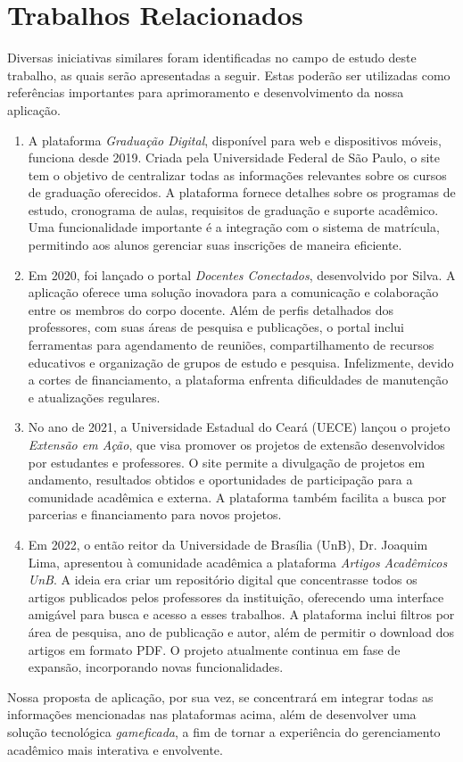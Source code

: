 \documentclass[a4paper,12pt]{report}
\begin{document}
\chapter{Trabalhos Relacionados}
Diversas iniciativas similares foram identificadas no campo de estudo deste trabalho, as quais serão apresentadas a seguir. Estas poderão ser utilizadas como referências importantes para aprimoramento e desenvolvimento da nossa aplicação.\

\begin{enumerate}
\item A plataforma \emph{Graduação Digital}, disponível para web e dispositivos móveis, funciona desde 2019. Criada pela Universidade Federal de São Paulo, o site tem o objetivo de centralizar todas as informações relevantes sobre os cursos de graduação oferecidos. A plataforma fornece detalhes sobre os programas de estudo, cronograma de aulas, requisitos de graduação e suporte acadêmico. Uma funcionalidade importante é a integração com o sistema de matrícula, permitindo aos alunos gerenciar suas inscrições de maneira eficiente.

\item Em 2020, foi lançado o portal \emph{Docentes Conectados}, desenvolvido por Silva. A aplicação oferece uma solução inovadora para a comunicação e colaboração entre os membros do corpo docente. Além de perfis detalhados dos professores, com suas áreas de pesquisa e publicações, o portal inclui ferramentas para agendamento de reuniões, compartilhamento de recursos educativos e organização de grupos de estudo e pesquisa. Infelizmente, devido a cortes de financiamento, a plataforma enfrenta dificuldades de manutenção e atualizações regulares.

\item No ano de 2021, a Universidade Estadual do Ceará (UECE) lançou o projeto \emph{Extensão em Ação}, que visa promover os projetos de extensão desenvolvidos por estudantes e professores. O site permite a divulgação de projetos em andamento, resultados obtidos e oportunidades de participação para a comunidade acadêmica e externa. A plataforma também facilita a busca por parcerias e financiamento para novos projetos.

\item Em 2022, o então reitor da Universidade de Brasília (UnB), Dr. Joaquim Lima, apresentou à comunidade acadêmica a plataforma \emph{Artigos Acadêmicos UnB}. A ideia era criar um repositório digital que concentrasse todos os artigos publicados pelos professores da instituição, oferecendo uma interface amigável para busca e acesso a esses trabalhos. A plataforma inclui filtros por área de pesquisa, ano de publicação e autor, além de permitir o download dos artigos em formato PDF. O projeto atualmente continua em fase de expansão, incorporando novas funcionalidades.

\end{enumerate}
Nossa proposta de aplicação, por sua vez, se concentrará em integrar todas as informações mencionadas nas plataformas acima, além de desenvolver uma solução tecnológica \textit{gameficada}, a fim de tornar a experiência do gerenciamento acadêmico mais interativa e envolvente.
\end{document}
